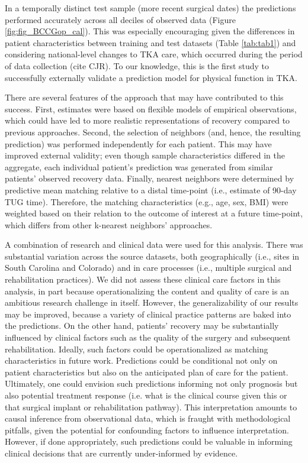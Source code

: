 \documentclass[fleqn,10pt]{wlscirep}\usepackage{knitr}
\begin{document}
In a temporally distinct test sample (more recent surgical dates) the predictions performed accurately across all deciles of observed data (Figure \ref{fig:fig_BCCGop_cal}). This was especially encouraging given the differences in patient characteristics between training and test datasets (Table \ref{tab:tab1}) and considering national-level changes to TKA care, which occurred during the period of data collection (cite CJR). To our knowledge, this is the first study to successfully externally validate a prediction model for physical function in TKA. 

There are several features of the approach that may have contributed to this success.  First, estimates were based on flexible models of empirical observations, which could have led to more realistic representations of recovery compared to previous approaches. Second, the selection of neighbors (and, hence, the resulting prediction) was performed independently for each patient. This may have improved external validity; even though sample characteristics differed in the aggregate, each individual patient’s prediction was generated from similar patients’ observed recovery data. Finally, nearest neighbors were determined by predictive mean matching relative to a distal time-point (i.e., estimate of 90-day TUG time). Therefore, the matching characteristics (e.g., age, sex, BMI) were weighted based on their relation to the outcome of interest at a future time-point, which differs from other k-nearest neighbors’ approaches. 

A combination of research and clinical data were used for this analysis. There was substantial variation across the source datasets, both geographically (i.e., sites in South Carolina and Colorado) and in care processes (i.e., multiple surgical and rehabilitation practices). We did not assess these clinical care factors in this analysis, in part because operationalizing the content and quality of care is an ambitious research challenge in itself.  However, the generalizability of our results may be improved, because a variety of clinical practice patterns are baked into the predictions.  On the other hand, patients’ recovery may be substantially influenced by clinical factors such as the quality of the surgery and subsequent rehabilitation. Ideally, such factors could be operationalized as matching characteristics in future work.  Predictions could be conditional not only on patient characteristics but also on the anticipated plan of care for the patient. Ultimately, one could envision such predictions informing not only prognosis but also potential treatment response (i.e. what is the clinical course given this or that surgical implant or rehabilitation pathway). This interpretation amounts to causal inference from observational data, which is fraught with methodological pitfalls, given the potential for confounding factors to influence interpretation. However, if done appropriately, such predictions could be valuable in informing clinical decisions that are currently under-informed by evidence.  
\end{document}
